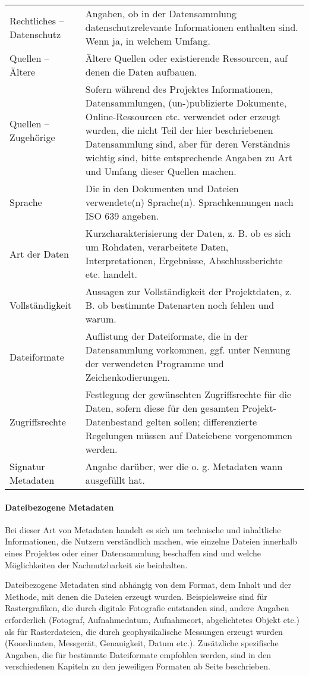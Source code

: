 \begin{center}
\begin{longtable}{L{0.25\textwidth} p{0.68\textwidth}}
		Rechtliches -- Datenschutz & Angaben, ob in der Datensammlung datenschutzrelevante Informationen enthalten sind. Wenn ja, in welchem Umfang.\\
		Quellen -- Ältere & Ältere Quellen oder existierende Ressourcen, auf denen die Daten aufbauen.\\
		Quellen -- Zugehörige & Sofern während des Projektes Informationen, Datensammlungen, (un-)publizierte Dokumente, Online-Ressourcen etc. verwendet oder erzeugt wurden, die nicht Teil der hier beschriebenen Datensammlung sind, aber für deren Verständnis wichtig sind, bitte entsprechende Angaben zu Art und Umfang dieser Quellen machen.\\
		Sprache & Die in den Dokumenten und Dateien verwendete(n) Sprache(n). Sprachkennungen nach ISO 639 angeben.\\
		Art der Daten & Kurzcharakterisierung der Daten, z. B. ob es sich um Rohdaten, verarbeitete Daten, Interpretationen, Ergebnisse, Abschlussberichte etc. handelt.\\
		Vollständigkeit & Aussagen zur Vollständigkeit der Projektdaten, z. B. ob bestimmte Datenarten noch fehlen und warum.\\
		Dateiformate & Auflistung der Dateiformate, die in der Datensammlung vorkommen, ggf. unter Nennung der verwendeten Programme und Zeichenkodierungen.\\
		Zugriffsrechte & Festlegung der gewünschten Zugriffsrechte für die Daten, sofern diese für den gesamten Projekt-Datenbestand gelten sollen; differenzierte Regelungen müssen auf Dateiebene vorgenommen werden.\\
		Signatur Metadaten & Angabe darüber, wer die o. g. Metadaten wann ausgefüllt hat.\\
		\bottomrule
	\end{longtable}
\end{center}

\paragraph{Dateibezogene Metadaten}
Bei dieser Art von Metadaten handelt es sich um technische und inhaltliche Informationen, die Nutzern verständlich machen, wie einzelne Dateien innerhalb eines Projektes oder einer Datensammlung beschaffen sind und welche Möglichkeiten der Nachnutzbarkeit sie beinhalten. 

Dateibezogene Metadaten sind abhängig von dem Format, dem Inhalt und der Methode, mit denen die Dateien erzeugt wurden. Beispielsweise sind für Rastergrafiken, die durch digitale Fotografie entstanden sind, andere Angaben erforderlich (Fotograf, Aufnahmedatum, Aufnahmeort, abgelichtetes Objekt etc.) als für Rasterdateien, die durch geophysikalische Messungen erzeugt wurden (Koordinaten, Messgerät, Genauigkeit, Datum etc.). Zusätzliche spezifische Angaben, die für bestimmte Dateiformate empfohlen werden, sind in den verschiedenen Kapiteln zu den jeweiligen Formaten ab Seite \pageref{dateiformate} beschrieben.

